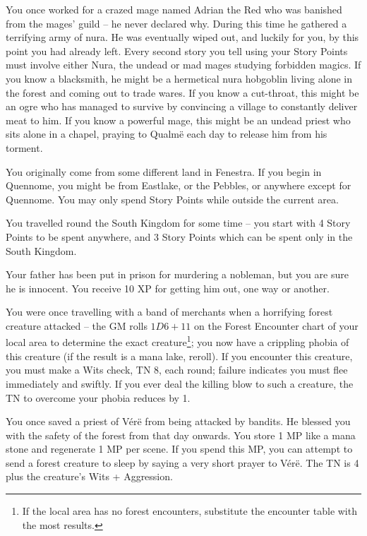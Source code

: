 \begin{multicols}{2}
\begin{list}{\addtocounter{list}{1}\textbf{:}}{\raggedleft}
\item{You once worked for a crazed mage named Adrian the Red who was banished from the mages' guild -- he never declared why.  During this time he gathered a terrifying army of nura.  He was eventually wiped out, and luckily for you, by this point you had already left.  Every second story you tell using your Story Points must involve either Nura, the undead or mad mages studying forbidden magics.  If you know a blacksmith, he might be a hermetical nura hobgoblin living alone in the forest and coming out to trade wares.  If you know a cut-throat, this might be an ogre who has managed to survive by convincing a village to constantly deliver meat to him.  If you know a powerful mage, this might be an undead priest who sits alone in a chapel, praying to Qualm\"{e} each day to release him from his torment.}

\item{You originally come from some different land in Fenestra.
	If you begin in Quennome, you might be from Eastlake, or the Pebbles, or anywhere except for Quennome.
	You may only spend Story Points while outside the current area.}

\item{You travelled round the South Kingdom for some time -- you start with 4 Story Points to be spent anywhere, and 3 Story Points which can be spent only in the South Kingdom.}

\item{Your father has been put in prison for murdering a nobleman, but you are sure he is innocent.
	You receive 10 XP for getting him out, one way or another.}

\item{You were once travelling with a band of merchants when a horrifying forest creature attacked -- the GM rolls $1D6+11$ on the Forest Encounter chart of your local area to determine the exact creature\footnote{If the local area has no forest encounters, substitute the encounter table with the most results.}; you now have a crippling phobia of this creature (if the result is a mana lake, reroll).  If you encounter this creature, you must make a Wits check, TN 8, each round; failure indicates you must flee immediately and swiftly.  If you ever deal the killing blow to such a creature, the TN to overcome your phobia reduces by 1.}

\item{You once saved a priest of V\'{e}r\"{e} from being attacked by bandits.  He blessed you with the safety of the forest from that day onwards.  You store 1 MP like a mana stone and regenerate 1 MP per scene.  If you spend this MP, you can attempt to send a forest creature to sleep by saying a very short prayer to V\'{e}r\"{e}.
The TN is 4 plus the creature's Wits + Aggression.
\iftoggle{core}{%
	See the core book, page \pageref{forestsong}, for the Forest Song spell.}{}
}


\end{list}
\end{multicols}
